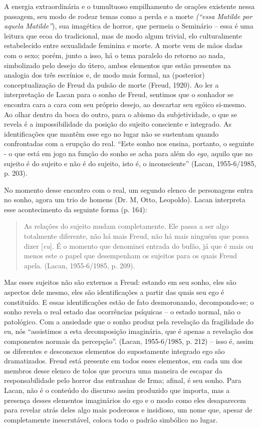 A energia extraordinária e o tumultuoso empilhamento de orações
existente nessa passagem, seu modo de rodear temas como a perda e a
morte \emph{(``essa Matilde por aquela Matilde''}), sua imagética de
horror, que permeia o Seminário -- essa é uma leitura que ecoa do
tradicional, mas de modo algum trivial, elo culturalmente estabelecido
entre sexualidade feminina e morte. A morte vem de mãos dadas com o
sexo; porém, junto a isso, há o tema paralelo do retorno ao nada,
simbolizado pelo desejo do útero, ambos elementos que estão presentes na
analogia dos três escrínios e, de modo mais formal, na (posterior)
conceptualização de Freud da pulsão de morte (Freud, 1920). Ao ler a
interpretação de Lacan para o sonho de Freud, sentimos que o sonhador se
encontra cara a cara com seu próprio desejo, ao descartar seu egóico
si-mesmo. Ao olhar dentro da boca do outro, para o abismo da
subjetividade, o que se revela é a impossibilidade da posição do sujeito
consciente e integrado. As identificações que mantêm esse ego no lugar
não se sustentam quando confrontadas com a erupção do real. ``Este sonho
nos ensina, portanto, o seguinte - o que está em jogo na função do sonho
se acha para além do \emph{ego,} aquilo que no sujeito é do sujeito e
não é do sujeito, isto é, o inconsciente'' (Lacan, 1955-6/1985, p. 203).

No momento desse encontro com o real, um segundo elenco de personagens
entra no sonho, agora um trio de homens (Dr. M, Otto, Leopoldo). Lacan
interpreta esse acontecimento da seguinte forma (p. 164):

\begin{quote}
As relações do sujeito mudam completamente. Ele passa a ser algo
totalmente diferente, não há mais Freud, não há mais ninguém que possa
dizer {[}\emph{eu}{]}. É o momento que denominei entrada do bufão, já
que é mais ou menos este o papel que desempenham os sujeitos para os
quais Freud apela. (Lacan, 1955-6/1985, p. 209).
\end{quote}

Mas esses sujeitos não são externos a Freud: estando em seu sonho, eles
são aspectos dele mesmo, eles são identificações a partir das quais seu
ego é constituído. E essas identificações estão de fato desmoronando,
decompondo-se; o sonho revela o real estado das ocorrências psíquicas --
o estado normal, não o patológico. Com a ansiedade que o sonho produz
pela revelação da fragilidade do eu, nós ``assistimos a esta
decomposição imaginária, que é apenas a revelação dos componentes
normais da percepção''. (Lacan, 1955-6/1985, p. 212) -- isso é, assim os
diferentes e desconexos elementos do supostamente integrado ego são
dramatizados. Freud está presente em todos esses elementos, em cada um
dos membros desse elenco de tolos que procura uma maneira de escapar da
responsabilidade pelo horror das entranhas de Irma; afinal, é seu sonho.
Para Lacan, não é o conteúdo do discurso assim produzido que importa,
mas a presença desses elementos imaginários do ego e o modo como eles
desaparecem para revelar atrás deles algo mais poderosos e insidioso, um
nome que, apesar de completamente inescrutável, coloca todo o padrão
simbólico no lugar.


